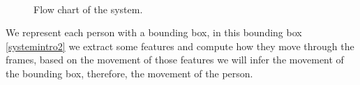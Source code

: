 \begin{figure}[H]
	
\centering

\\


\caption{Flow chart of the system.}
\label{introTracking3}
\end{figure}

We represent each person with a bounding box, in this bounding box \ref{systemintro2} we extract some features and compute how they move through the frames, based on the movement of those features we will infer the movement of the bounding box, therefore, the movement of the person.


